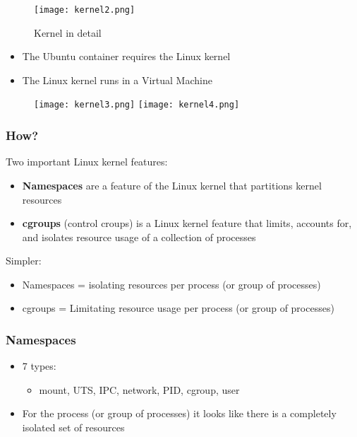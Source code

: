 \documentclass{article}
\newcommand{\bold}[1]{\textbf{#1}}
\begin{document}
\begin{figure}[H]
    \centering
    \texttt{[image: kernel2.png]}
    \caption{Kernel in detail}
\end{figure}

\begin{itemize}
    \item The Ubuntu container requires the Linux kernel
    \item The Linux kernel runs in a Virtual Machine
\end{itemize}

\begin{figure}[H]
    \centering
    \texttt{[image: kernel3.png]}
    \texttt{[image: kernel4.png]}
    \caption{}
\end{figure}

\subsubsection{How?}

Two important Linux kernel features:

\begin{itemize}
    \item \bold{Namespaces} are a feature of the Linux kernel that partitions kernel resources
    \item \bold{cgroups} (control croups) is a Linux kernel feature that limits, accounts for, and isolates resource usage of a collection of processes 
\end{itemize}

Simpler:

\begin{itemize}
    \item Namespaces = isolating resources per process (or group of processes)
    \item cgroups = Limitating resource usage per process (or group of processes)
\end{itemize}

\subsubsection{Namespaces}

\begin{itemize}
    \item 7 types:
    \begin{itemize}
        \item mount, UTS, IPC, network, PID, cgroup, user
    \end{itemize} 
    \item For the process (or group of processes) it looks like there is a completely isolated set of resources
\end{itemize}
\end{document}
